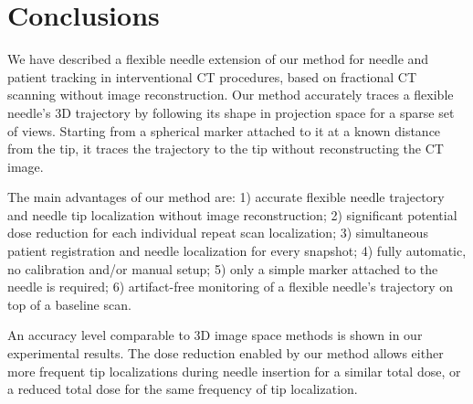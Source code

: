 \documentclass[letterpaper, 11 pt, conference]{ieeeconf} %
\begin{document}
\section{Conclusions}
We have described a flexible needle extension of our method for needle and patient tracking in interventional CT procedures, based on fractional CT scanning without image reconstruction.
Our method accurately traces a flexible needle's 3D trajectory by following its shape in projection space for a sparse set of views. Starting from a spherical marker attached to it at a known distance from the tip, it traces the trajectory to the tip without reconstructing the CT image.

The main advantages of our method are:
1) accurate flexible needle trajectory and needle tip localization without image reconstruction;
2) significant potential dose reduction for each individual repeat scan localization;
3) simultaneous patient registration and needle localization for every snapshot; 
4) fully automatic, no calibration and/or manual setup;
5) only a simple marker attached to the needle is required; 
6) artifact-free monitoring of a flexible needle's trajectory on top of a baseline scan.

An accuracy level comparable to 3D image space methods is shown in our experimental results.
The dose reduction enabled by our method allows either more frequent tip localizations during needle insertion for a similar total dose, or a reduced total dose for the same frequency of tip localization.





\end{document}
